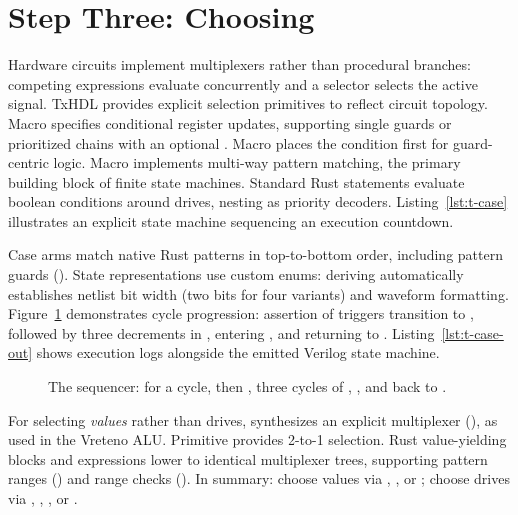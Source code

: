 \documentclass[journal,9pt]{IEEEtran}
\begin{document}
\section{Step Three: Choosing}
\label{sec:t-choosing}

Hardware circuits implement multiplexers rather than procedural branches:
competing expressions evaluate concurrently and a selector selects the active
signal. TxHDL provides explicit selection primitives to reflect circuit
topology. Macro  specifies conditional register updates, supporting
single guards or prioritized chains with an optional . Macro
 places the condition first for guard-centric
logic. Macro  implements multi-way pattern matching, the primary
building block of finite state machines. Standard Rust  statements
evaluate boolean conditions around  drives, nesting as priority
decoders. Listing~\ref{lst:t-case} illustrates an explicit state machine
sequencing an execution countdown.



Case arms match native Rust patterns in top-to-bottom order, including pattern
guards (). State representations use custom enums:
deriving  automatically establishes netlist bit width (two bits for
four variants) and waveform formatting. Figure~\ref{fig:t-case} demonstrates
cycle progression: assertion of  triggers transition to ,
followed by three decrements in , entering , and returning
to . Listing~\ref{lst:t-case-out} shows execution logs alongside the
emitted Verilog state machine.

\begin{figure}[htbp]
\centering

\caption{The sequencer:  for a cycle, then ,
three cycles of , , and back to .}
\label{fig:t-case}
\end{figure}



For selecting \emph{values} rather than drives,  synthesizes an
explicit multiplexer (),
as used in the Vreteno ALU. Primitive  provides 2-to-1
selection. Rust value-yielding  blocks and 
expressions lower to identical multiplexer trees, supporting pattern ranges
() and range checks (). In
summary: choose values via , , or ; choose
drives via , , , or .
\end{document}
